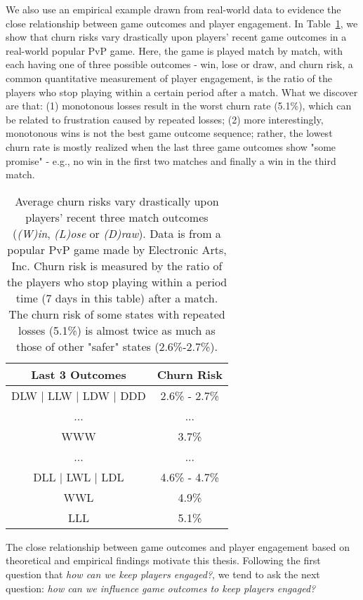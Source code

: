 We also use an empirical example drawn from real-world data to evidence the close relationship between game outcomes and player engagement. In Table~\ref{tab:churnrate}, we show that churn risks vary drastically upon players' recent game outcomes in a real-world popular PvP game. Here, the game is played match by match, with each having one of three possible outcomes - win, lose or draw, and churn risk, a common quantitative measurement of player engagement, is the ratio of the players who stop playing within a certain period after a match. What we discover are that: (1) monotonous losses result in the worst churn rate (5.1\%), which can be related to frustration caused by repeated losses; (2) more interestingly, monotonous wins is not the best game outcome sequence; rather, the lowest churn rate is mostly realized when the last three game outcomes show "some promise" - e.g., no win in the first two matches and finally a win in the third match.                   

\begin{table}
\centering
\caption{
Average churn risks vary drastically upon players' recent three match outcomes (\emph{(W)in}, \emph{(L)ose} or \emph{(D)raw}). Data is from a popular PvP game made by Electronic Arts, Inc. Churn risk is measured by the ratio of the players who stop playing within a period time (7 days in this table) after a match. The churn risk of some states with repeated losses (5.1\%) is almost twice as much as those of other "safer" states (2.6\%-2.7\%).
} \label{tab:churnrate}
\vspace{2mm}
\begin{tabular}{|c|c|}
\hline
Last 3 Outcomes & Churn Risk                      \\ \hline
DLW $|$ LLW $|$ LDW $|$ DDD      &  2.6\% - 2.7\%        \\
... & ...  \\
WWW   &  3.7\% \\
... & ... \\
DLL $|$ LWL $|$ LDL  &  4.6\% - 4.7\%  \\
WWL & 4.9\% \\
LLL & 5.1\% \\
\hline
\end{tabular}
\end{table}

The close relationship between game outcomes and player engagement based on theoretical and empirical findings motivate this thesis. Following the first question that \textit{how can we keep players engaged?}, we tend to ask the next question: \textit{how can we influence game outcomes to keep players engaged?}

